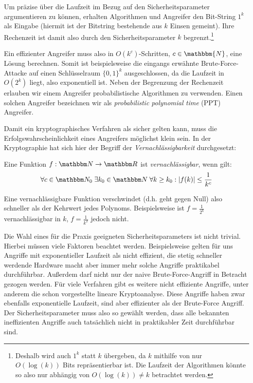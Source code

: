 Um präzise über die Laufzeit im Bezug auf den Sicherheitsparameter argumentieren zu können, erhalten Algorithmen und Angreifer den Bit-String $1^k$ als Eingabe (hiermit ist der Bitstring bestehende aus $k$ Einsen gemeint). Ihre Rechenzeit ist damit also durch den Sicherheitsparameter $k$ begrenzt.\footnote{Deshalb wird auch $1^k$ statt $k$ übergeben, da $k$ mithilfe von nur $O(\log(k))$ Bits repräsentierbar ist. Die Laufzeit der Algorithmen könnte so also nur abhängig von $O(\log(k)) \neq k$ betrachtet werden.} 

Ein effizienter Angreifer muss also in $O(k^c)$-Schritten, $c \in \mathbbm{N}$, eine Lösung berechnen. Somit ist beispielsweise die eingangs erwähnte Brute-Force-Attacke auf einen Schlüsselraum $\{0, 1\}^{k}$ ausgeschlossen, da die Laufzeit in $O(2^{k})$ liegt, also exponentiell ist.
Neben der Begrenzung der Rechenzeit erlauben wir einem Angreifer probabilistische Algorithmen zu verwenden. Einen solchen Angreifer bezeichnen wir als \emph{probabilistic polynomial time} (PPT) Angreifer.

Damit ein kryptographisches Verfahren als sicher gelten kann, muss die Erfolgswahrscheinlichkeit eines Angreifers möglichst \glqq klein\grqq{} sein. In der Kryptographie hat sich hier der Begriff der \emph{Vernachlässigbarkeit} durchgesetzt:
\begin{definition}[Vernachlässigbarkeit]
	Eine Funktion $f: \N \to \R$ ist \emph{vernachlässigbar}, wenn gilt:
	\begin{align*}
	\forall c \in \N_0 \; \exists k_0 \in \N \; \forall k \geq k_0 : \vert f(k) \vert \leq \frac{1}{k^c} 
	\end{align*}
\end{definition}
Eine vernachlässigbare Funktion \glqq verschwindet\grqq{} (d.h. geht gegen Null) also schneller als der Kehrwert jedes Polynoms. Beispielsweise ist $f = \frac{1}{2^k}$ vernachlässigbar in $k$, $f = \frac{1}{k^2}$ jedoch nicht.

Die Wahl eines für die Praxis geeigneten Sicherheitsparameters ist nicht trivial. Hierbei müssen viele Faktoren beachtet werden. Beispielsweise gelten für uns Angriffe mit exponentieller Laufzeit als nicht effizient, die stetig schneller werdende Hardware macht aber immer mehr solche Angriffe praktikabel durchführbar.
Außerdem darf nicht nur der naive Brute-Force-Angriff in Betracht gezogen werden. Für viele Verfahren gibt es weitere nicht effiziente Angriffe, unter anderem die schon vorgestellte lineare Kryptoanalyse. Diese Angriffe haben zwar ebenfalls exponentielle Laufzeit, sind aber effizienter als der Brute-Force Angriff. Der Sicherheitsparameter muss also so gewählt werden, dass alle bekannten ineffizienten Angriffe auch tatsächlich nicht in praktikabler Zeit durchführbar sind. 

